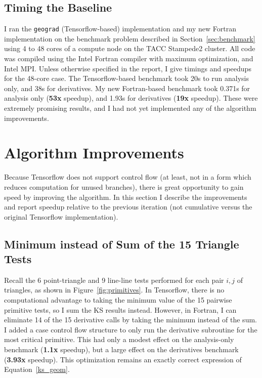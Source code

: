 \documentclass[11pt,letterpaper]{article}
\begin{document}
\subsection{Timing the Baseline}
\qquad I ran the \texttt{geograd} (Tensorflow-based) implementation and my new Fortran implementation on the benchmark problem described in Section~\ref{sec:benchmark} using 4 to 48 cores of a compute node on the TACC Stampede2 cluster.
All code was compiled using the Intel Fortran compiler with maximum optimization, and Intel MPI.
Unless otherwise specified in the report, I give timings and speedups for the 48-core case.
The Tensorflow-based benchmark took 20s to run analysis only, and 38s for derivatives.
My new Fortran-based benchmark took 0.371s for analysis only (\textbf{53x} speedup), and 1.93s for derivatives (\textbf{19x} speedup).
These were extremely promising results, and I had not yet implemented any of the algorithm improvements.

\section{Algorithm Improvements}
\qquad Because Tensorflow does not support control flow (at least, not in a form which reduces computation for unused branches), there is great opportunity to gain speed by improving the algorithm.
In this section I describe the improvements and report speedup relative to the previous iteration (not cumulative versus the original Tensorflow implementation).

\subsection{Minimum instead of Sum of the 15 Triangle Tests}
\qquad Recall the 6 point-triangle and 9 line-line tests performed for each pair $i,j$ of triangles, as shown in Figure~\ref{fig:primitives}.
In Tensorflow, there is no computational advantage to taking the minimum value of the 15 pairwise primitive tests, so I sum the KS results instead.
However, in Fortran, I can eliminate 14 of the 15 derivative calls by taking the minimum instead of the sum.
I added a case control flow structure to only run the derivative subroutine for the most critical primitive.
This had only a modest effect on the analysis-only benchmark (\textbf{1.1x} speedup), but a large effect on the derivatives benchmark (\textbf{3.93x} speedup).
This optimization remains an exactly correct expression of Equation~\ref{ks_geom}.
\end{document}
